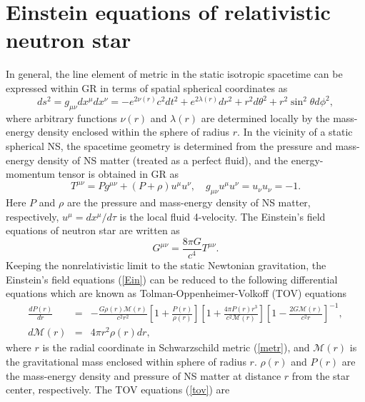 \section{Einstein equations of relativistic neutron star}%
\label{sec3.1}
In general, the line element of metric in the static isotropic spacetime can be 
expressed within GR  \citep{oppenheimer1939massive} in terms of spatial spherical 
coordinates as
\begin{equation}
        ds^2 = g_{\mu\nu}dx^\mu dx^\nu= - e^{2\nu(r)}c^2dt^2 + e^{2\lambda(r)}dr^2 + 
				r^2 d\theta^2 + r^2\sin^2\theta d\phi^2, \label{metr}
\end{equation}
where arbitrary functions $\nu(r)$ and $\lambda(r)$ are determined locally by the
mass-energy density enclosed within the sphere of radius $r$. In the vicinity of a 
static spherical NS, the spacetime geometry is determined from the pressure and 
mass-energy density of NS matter (treated as a perfect fluid), and the  
energy-momentum tensor is obtained in \gls{GR} as
\begin{equation}
        T^{\mu\nu}= Pg^{\mu\nu} + (P+\rho) u^\mu u^\nu,\quad
				g_{\mu\nu}u^\mu u^\nu=u_\nu u_\nu=-1.
\end{equation}
Here $P$ and $\rho$ are the pressure and mass-energy density of NS matter, respectively,
$u^\mu = dx^\mu/d\tau$ is the local fluid 4-velocity. The Einstein's field 
equations of neutron star are written as 
\begin{equation}
        G^{\mu\nu} = \frac{8\pi G}{c^4} T^{\mu\nu}. \label{Ein} 
\end{equation}
Keeping the nonrelativistic limit to the static Newtonian gravitation, the 
Einstein's field equations (\ref{Ein}) can be reduced to the following differential 
equations which are known as Tolman-Oppenheimer-Volkoff (\gls{TOV}) equations 
\citep{oppenheimer1939massive}
\begin{eqnarray}
\frac{d P(r)}{dr}&=& -\frac{G \rho(r)\mathcal{M}(r)}{c^2 r^2} 
 \left[ 1+\frac{P(r)}{\rho(r)}\right] 
\left[1+\frac{4 \pi P(r) r^3}{c^2 \mathcal{M}(r)} \right] 
\left[ 1-\frac{2G \mathcal{M}(r)}{c^2 r} \right]^{-1}, \nonumber \\
d\mathcal{M}(r) &=& 4\pi r^2 \rho(r)dr, \label{tov} 
\end{eqnarray}
where $r$ is the radial coordinate in Schwarzschild metric (\ref{metr}), and 
$\mathcal{M}(r)$ is the gravitational mass enclosed within sphere of radius $r$. 
$\rho(r)$ and $P(r)$ are the mass-energy density and pressure of NS matter at 
distance $r$ from the star center, respectively. The \gls{TOV} equations (\ref{tov}) are 
